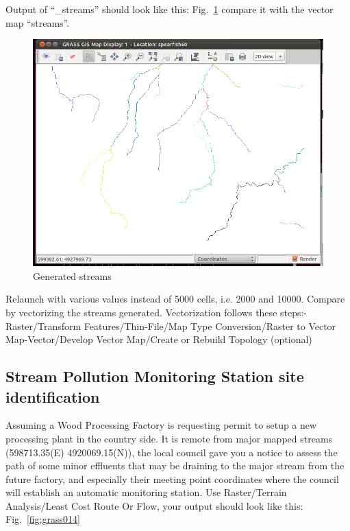 Output of ``\_streams'' should look like this: Fig.~\ref{fig:grass013} compare it with
the vector map ``streams''.

\begin{figure}[htbp]
   \centering
   \includegraphics[scale=0.35]{grass013.png}
   \caption{Generated streams}
   \label{fig:grass013}
\end{figure}

Relaunch with various values instead of 5000 cells, i.e. 2000 and 10000.
Compare by vectorizing the streams generated. Vectorization follows
these steps:-Raster/Transform Features/Thin-File/Map Type Conversion/Raster to Vector Map-Vector/Develop Vector Map/Create or Rebuild Topology (optional)\newline

\subsection{Stream Pollution Monitoring Station site identification}
Assuming a Wood Processing Factory is requesting permit to setup a new processing plant in the country side. It is remote from major mapped streams (598713.35(E) 4920069.15(N)), the local council gave you a notice to assess the path of some minor effluents that may be draining to the major stream from the future factory, and especially their meeting point coordinates where the council will establish an automatic monitoring station.
Use Raster/Terrain Analysis/Least Cost Route Or Flow, your output should look like this: Fig.~\ref{fig:grass014}

